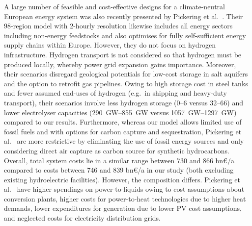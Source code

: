 A large number of feasible and cost-effective designs for a climate-neutral
European energy system was also recently presented by Pickering et
al.~\cite{pickeringDiversityOptions2022}. Their 98-region model with 2-hourly
resolution likewise includes all energy sectors including non-energy feedstocks
and also optimises for fully self-sufficient energy supply chains within Europe.
However, they do not focus on hydrogen infrastructure. Hydrogen transport is not
considered so that hydrogen must be produced locally, whereby power grid
expansion gains importance. Moreover, their scenarios disregard geological
potentials for low-cost storage in salt aquifers and the option to retrofit gas
pipelines. Owing to high storage cost in steel tanks and fewer assumed end-uses
of hydrogen (e.g.~in shipping and heavy-duty transport), their scenarios involve
less hydrogen storage (\SIrange{0}{6}{\twh} versus \SIrange{32}{66}{\twh}) and
lower electrolyser capacities (\SIrange{290}{855}{\giga\watt} versus
\SIrange{1057}{1297}{\giga\watt}) compared to our results. Furthermore, whereas
our model allows limited use of fossil fuels and with options for carbon capture
and sequestration, Pickering et al.~\cite{pickeringDiversityOptions2022} are more
restrictive by eliminating the use of fossil energy sources and only considering
direct air capture as carbon source for synthetic hydrocarbons. Overall, total
system costs lie in a similar range between 730 and 866 bn\euro/a compared to
costs between 746 and 839 bn\euro/a in our study (both excluding existing
hydroelectric facilities). However, the composition differs. Pickering et
al.~\cite{pickeringDiversityOptions2022} have higher spendings on power-to-liquids
owing to cost assumptions about conversion plants, higher costs for
power-to-heat technologies due to higher heat demands, lower expenditures for
generation due to lower PV cost assumptions, and neglected costs for electricity
distribution grids.




